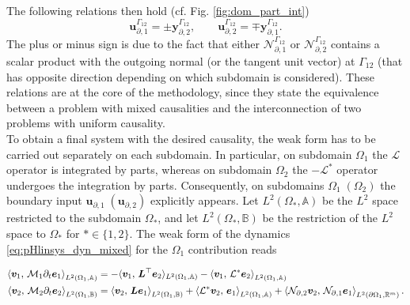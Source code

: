 The following relations then hold (cf. Fig. \ref{fig:dom_part_int})
\begin{equation}\label{eq:int_var}
\bm{u}_{\partial, 1}^{\Gamma_{12}} =\pm \bm{y}_{\partial, 2}^{\Gamma_{12}}, \qquad \bm{u}_{\partial, 2}^{\Gamma_{12}} = \mp \bm{y}_{\partial, 1}^{\Gamma_{12}}.
\end{equation}
The plus or minus sign is due to the fact that either $\mathcal{N}_{\partial, 1}^{\Gamma_{12}}$ or $\mathcal{N}_{\partial, 2}^{\Gamma_{12}}$ contains a scalar product with the outgoing normal (or the tangent unit vector) at ${\Gamma_{12}}$ (that has opposite direction depending on which subdomain is considered). These relations are at the core of the methodology, since they state the equivalence between a problem with mixed causalities and the interconnection of two problems with uniform causality.   \\

To obtain a final system with the desired causality, the weak form has to be carried out separately on each subdomain. In particular, on subdomain $\Omega_1$ the $\mathcal{L}$ operator is integrated by parts, whereas on subdomain $\Omega_2$ the $-\mathcal{L}^*$ operator undergoes the integration by parts. Consequently, on subdomains $\Omega_1 \; (\Omega_2)$ the boundary input $\bm{u}_{\partial, 1} \; (\bm{u}_{\partial, 2})$ explicitly appears. Let $L^2(\Omega_*, \mathbb{A})$ be the $L^2$ space restricted to the subdomain $\Omega_*$, and let $L^2(\Omega_*, \mathbb{B})$ be the restriction of the $L^2$ space to $\Omega_*$ for $* \in \{1,2\}$. The weak form of the dynamics \eqref{eq:pHlinsys_dyn_mixed} for the $\Omega_1$ contribution reads

\begin{equation}\label{eq:pHlinsys_weak_Om1}
\begin{aligned}
\inner[L^2(\Omega_1, \mathbb{A})]{\bm{v}_1}{\mathcal{M}_1 \partial_t \bm{e}_1} &=   -  \langle{\bm{v}_1}, \,{\bm{L}^\top \bm{e}_2}\rangle_{L^2(\Omega_1, \mathbb{A})}  -\inner[L^2(\Omega_1, \mathbb{A})]{\bm{v}_1}{\mathcal{L}^*\bm{e}_2}  \\
\inner[L^2(\Omega_1, \mathbb{B})]{\bm{v}_2}{\mathcal{M}_2 \partial_t \bm{e}_2} &=   \inner[L^2(\Omega_1, \mathbb{B})]{\bm{v}_2}{\bm{L}\bm{e}_1} + \inner[L^2(\Omega_1, \mathbb{A})]{\mathcal{L}^*\bm{v}_2}{\bm{e}_1} + \inner[L^2(\partial\Omega_1, \mathbb{R}^m)]{\mathcal{N}_{\partial, 2} \bm{v}_2}{\mathcal{N}_{\partial, 1}\bm{e}_1}. \\
\end{aligned}
\end{equation}

